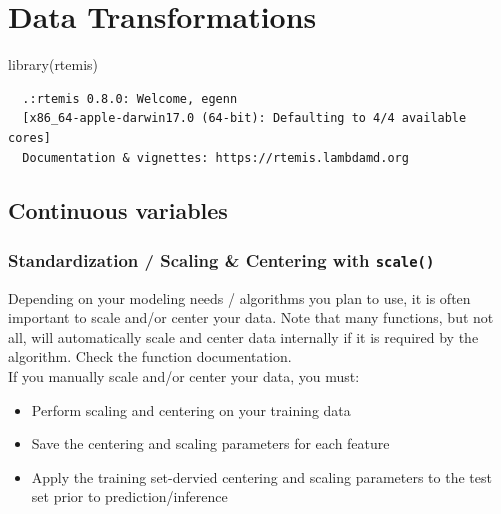 \documentclass[
]{book}
\newenvironment{Shaded}{\begin{snugshade}}{\end{snugshade}}
\newcommand{\FunctionTok}[1]{\textcolor[rgb]{0.00,0.00,0.00}{#1}}
\newcommand{\NormalTok}[1]{#1}
\providecommand{\tightlist}{%
  \setlength{\itemsep}{0pt}\setlength{\parskip}{0pt}}
\begin{document}
\hypertarget{datatrans}{%
\chapter{Data Transformations}\label{datatrans}}

\begin{Shaded}
\begin{Highlighting}[]
\FunctionTok{library}\NormalTok{(rtemis)}
\end{Highlighting}
\end{Shaded}

\begin{verbatim}
  .:rtemis 0.8.0: Welcome, egenn
  [x86_64-apple-darwin17.0 (64-bit): Defaulting to 4/4 available cores]
  Documentation & vignettes: https://rtemis.lambdamd.org
\end{verbatim}

\hypertarget{continuous-variables}{%
\section{Continuous variables}\label{continuous-variables}}

\hypertarget{standardization-scaling-centering-with-scale}{%
\subsection{\texorpdfstring{Standardization / Scaling \& Centering with \texttt{scale()}}{Standardization / Scaling \& Centering with scale()}}\label{standardization-scaling-centering-with-scale}}

Depending on your modeling needs / algorithms you plan to use, it is often important to scale and/or center your data. Note that many functions, but not all, will automatically scale and center data internally if it is required by the algorithm. Check the function documentation.\\
If you manually scale and/or center your data, you must:

\begin{itemize}
\tightlist
\item
  Perform scaling and centering on your training data
\item
  Save the centering and scaling parameters for each feature
\item
  Apply the training set-dervied centering and scaling parameters to the test set prior to prediction/inference
\end{itemize}
\end{document}
